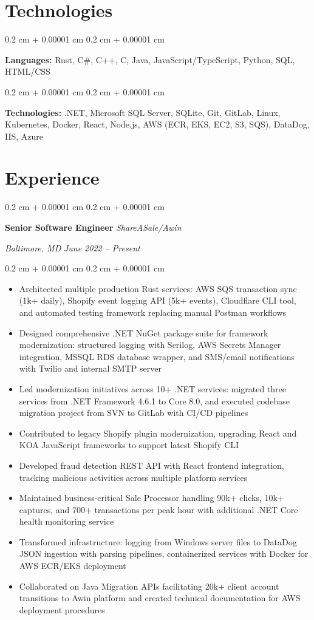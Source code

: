 \documentclass[10pt, letterpaper]{article}
\newenvironment{highlights}{
    \begin{itemize}[
        topsep=0.10 cm,
        parsep=0.10 cm,
        partopsep=0pt,
        itemsep=0pt,
        leftmargin=0.4 cm + 10pt
        ]
    }{
\end{itemize}
} %
\newenvironment{onecolentry}{
    \begin{adjustwidth}{
            0.2 cm + 0.00001 cm
        }{
            0.2 cm + 0.00001 cm
        }
    }{
    \end{adjustwidth}
} %
\newenvironment{twocolentry}[2][]{
    \onecolentry
    \def\secondColumn{#2}
    \setcolumnwidth{\fill, 10.5 cm}
    \begin{paracol}{2}
    }{
        \switchcolumn \raggedleft \secondColumn
    \end{paracol}
    \endonecolentry
} %
\begin{document}
\section{Technologies}
\begin{onecolentry}
    \textbf{Languages:} Rust, C\#, C++, C, Java, JavaScript/TypeScript, Python, SQL, HTML/CSS
\end{onecolentry}
\vspace{0.2 cm}
\begin{onecolentry}
    \textbf{Technologies:} .NET, Microsoft SQL Server, SQLite, Git, GitLab, Linux, Kubernetes, Docker, React, Node.js, AWS (ECR, EKS, EC2, S3, SQS), DataDog, IIS, Azure
\end{onecolentry}
\section{Experience}
\begin{twocolentry}{
    \textit{Baltimore, MD}
    \textit{June 2022 – Present}}
    \textbf{Senior Software Engineer}
    \textit{ShareASale/Awin}
\end{twocolentry}
\begin{onecolentry}
    \begin{highlights}
        \item Architected multiple production Rust services: AWS SQS transaction sync (1k+ daily), Shopify event logging API (5k+ events), Cloudflare CLI tool, and automated testing framework replacing manual Postman workflows
        \item Designed comprehensive .NET NuGet package suite for framework modernization: structured logging with Serilog, AWS Secrets Manager integration, MSSQL RDS database wrapper, and SMS/email notifications with Twilio and internal SMTP server
        \item Led modernization initiatives across 10+ .NET services: migrated three services from .NET Framework 4.6.1 to Core 8.0, and executed codebase migration project from SVN to GitLab with CI/CD pipelines
        \item Contributed to legacy Shopify plugin modernization, upgrading React and KOA JavaScript frameworks to support latest Shopify CLI
        \item Developed fraud detection REST API with React frontend integration, tracking malicious activities across multiple platform services
        \item Maintained business-critical Sale Processor handling 90k+ clicks, 10k+ captures, and 700+ transactions per peak hour with additional .NET Core health monitoring service
        \item Transformed infrastructure: logging from Windows server files to DataDog JSON ingestion with parsing pipelines, containerized services with Docker for AWS ECR/EKS deployment
        \item Collaborated on Java Migration APIs facilitating 20k+ client account transitions to Awin platform and created technical documentation for AWS deployment procedures
        \end{highlights}
\end{onecolentry}
\end{document}
